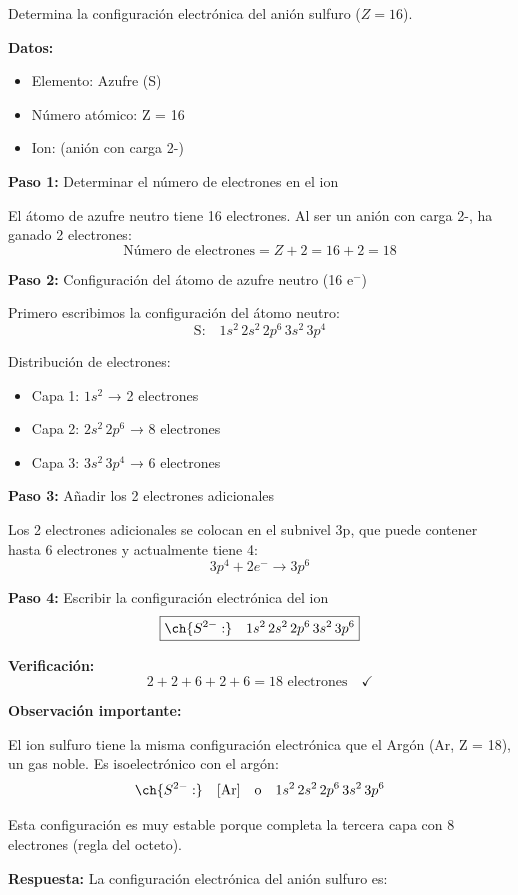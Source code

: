 \begin{exercise}
    Determina la configuración electrónica del anión sulfuro  (\( Z = 16 \)).
    \begin{solu}
        \textbf{Datos:}
        \begin{itemize}
            \item Elemento: Azufre (S)
            \item Número atómico: Z = 16
            \item Ion:  (anión con carga 2-)
        \end{itemize}

        \textbf{Paso 1:} Determinar el número de electrones en el ion

        El átomo de azufre neutro tiene 16 electrones. Al ser un anión con carga 2-, ha ganado 2 electrones:
        \[
            \text{Número de electrones} = Z + 2 = 16 + 2 = 18
        \]

        \textbf{Paso 2:} Configuración del átomo de azufre neutro (16 e\(^-\))

        Primero escribimos la configuración del átomo neutro:
        \[
            \text{S:} \quad 1s^2 \, 2s^2 \, 2p^6 \, 3s^2 \, 3p^4
        \]

        Distribución de electrones:
        \begin{itemize}
            \item Capa 1: \(1s^2\) → 2 electrones
            \item Capa 2: \(2s^2 \, 2p^6\) → 8 electrones
            \item Capa 3: \(3s^2 \, 3p^4\) → 6 electrones
        \end{itemize}

        \textbf{Paso 3:} Añadir los 2 electrones adicionales

        Los 2 electrones adicionales se colocan en el subnivel 3p, que puede contener hasta 6 electrones y actualmente tiene 4:
        \[
            3p^4 + 2e^- \rightarrow 3p^6
        \]

        \textbf{Paso 4:} Escribir la configuración electrónica del ion
        \[
            \boxed{\ch{S^{2-}:} \quad 1s^2 \, 2s^2 \, 2p^6 \, 3s^2 \, 3p^6}
        \]

        \textbf{Verificación:}
        \[
            2 + 2 + 6 + 2 + 6 = 18 \text{ electrones} \quad \checkmark
        \]

        \textbf{Observación importante:}

        El ion sulfuro  tiene la misma configuración electrónica que el Argón (Ar, Z = 18), un gas noble. Es isoelectrónico con el argón:
        \[
            \ch{S^{2-}:} \quad [\text{Ar}] \quad \text{o} \quad 1s^2 \, 2s^2 \, 2p^6 \, 3s^2 \, 3p^6
        \]

        Esta configuración es muy estable porque completa la tercera capa con 8 electrones (regla del octeto).

        \textbf{Respuesta:} La configuración electrónica del anión sulfuro es: 
    \end{solu}
\end{exercise}
